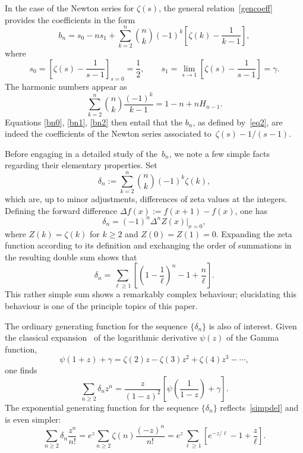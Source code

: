 \documentclass{amsart}
\begin{document}
In the case of the Newton series for $\zeta(s)$, the general
relation~\eqref{gencoeff} provides the coefficients in the form
\begin{equation}\label{bn0}
b_n = s_0-ns_1+\sum_{k=2}^n \binom{n}{k} (-1)^k \left[\zeta(k)-\frac{1}{k-1}
\right],
\end{equation}
where
\begin{equation}\label{bn1}
s_0=\left[\zeta(s)-\frac{1}{s-1}\right]_{s=0}=\frac12,
\qquad
s_1=\lim_{s\to 1} \left[\zeta(s)-\frac{1}{s-1}\right] = \gamma.
\end{equation}
The harmonic numbers appear as
\begin{equation}\label{bn2}
\sum_{k=2}^n \binom{n}{k}\frac{(-1)^k}{k-1}=1-n+nH_{n-1}.
\end{equation}
Equations \eqref{bn0}, \eqref{bn1},   \eqref{bn2} 
then entail that   the
$b_n$, as  defined by~\eqref{eq2}, are indeed the  coefficients  of the Newton series
associated to~$\zeta(s)-1/(s-1)$.

\smallskip

Before engaging in a detailed study of the~$b_n$, we note a few 
simple facts regarding their elementary properties. Set
\begin{equation}\label{deldef}
\delta_n:=\sum_{k=2}^n \binom{n}{k} (-1)^k \zeta(k),
\end{equation}
which are, up to minor adjustments, differences of zeta values at the
integers.  Defining the forward difference $\Delta f(x):=f(x+1)-f(x)$,
one has
\[
\delta_n= (-1)^n \Delta^n Z(x) \bigg|_{x=0},\]
where $Z(k)=\zeta(k)$ for $k\ge2$ and $Z(0)=Z(1)=0$.
Expanding the zeta function according to its definition and 
exchanging the order of summations in the resulting double sum shows that
\begin{equation}\label{simpdel}
\delta_n = \sum_{\ell\ge1} \left[\left(1-\frac{1}{\ell}\right)^n-1+\frac{n}{\ell}\right].
\end{equation}
This rather simple sum shows a remarkably complex behaviour;
elucidating this behaviour is one of the principle topics of this paper.


The ordinary generating function for the sequence $\{\delta_n\}$ 
is also of interest.
Given the classical expansion~\cite{WhWa27} 
of the logarithmic derivative $\psi(z)$ of the Gamma function,
\[
\psi(1+z)+\gamma=\zeta(2)z-\zeta(3)z^2+\zeta(4)z^3-\cdots,
\]
one finds
\begin{equation}\label{delogf}
\sum_{n\ge2}\delta_n z^n =\frac{z}{(1-z)^2}\left[\psi\left(\frac{1}{1-z}\right)
+\gamma\right].
\end{equation}
The exponential generating function for the sequence  $\{\delta_n\}$ reflects~\eqref{simpdel} and is even simpler:
\begin{equation}\label{delegf}
\sum_{n\ge2}\delta_n \frac{z^n}{n!}
=e^z\sum_{n\ge2} \zeta(n) \frac{(-z)^n}{n!}=e^z \sum_{\ell\ge1}
\left[e^{-z/\ell}-1+\frac{z}{\ell}\right]
.
\end{equation}
\end{document}

